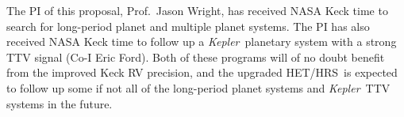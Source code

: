 \documentclass[12pt]{article}
\def\kepler{{\it Kepler}}
\def\hrs{HET/HRS}
\begin{document}
The PI of this proposal, Prof.~Jason Wright, has received NASA Keck
time to search for long-period planet and multiple planet systems.
The PI has also received NASA Keck time to follow up a
\kepler\ planetary system with a strong TTV signal (Co-I Eric
Ford). Both of these programs will of no doubt benefit from the
improved Keck RV precision, and the upgraded \hrs\ is expected to
follow up some if not all of the long-period planet systems and
\kepler\ TTV systems in the future.


\vspace{-3pt}
\end{document}
